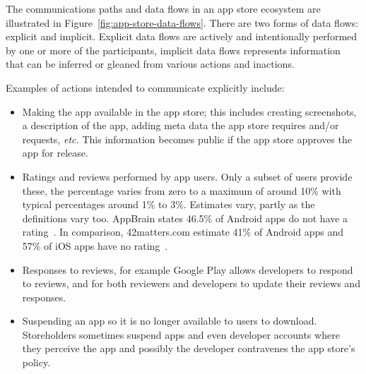 
The communications paths and data flows in an app store ecosystem are illustrated in Figure~\ref{fig:app-store-data-flows}. There are two forms of data flows: explicit and implicit. Explicit data flows are actively and intentionally performed by one or more of the participants, implicit data flows represents information that can be inferred or gleaned from various actions and inactions.

Examples of actions intended to communicate explicitly include:
\begin{itemize}
    \item Making the app available in the app store; this includes creating screenshots, a description of the app, adding meta data the app store requires and/or requests, \emph{etc.} This information becomes public if the app store approves the app for release.
    \item Ratings and reviews performed by app users. Only a subset of users provide these, the percentage varies from zero to a maximum of around 10\% with typical percentages around 1\% to 3\%. %
    Estimates vary, partly as the definitions vary too. AppBrain states 46.5\% of Android apps do not have a rating~. In comparison, 42matters.com estimate 41\% of Android apps and 57\% of iOS apps have no rating~.
    \item Responses to reviews, for example Google Play allows developers to respond to reviews, and for both reviewers and developers to update their reviews and responses.
    \item Suspending an app so it is no longer available to users to download. Storeholders sometimes suspend apps and even developer accounts where they perceive the app and possibly the developer contravenes the app store's policy. %
    
\end{itemize}
% 

